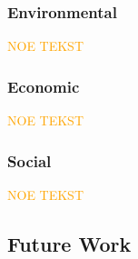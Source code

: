 \subsubsection{Environmental}

\textcolor{orange}{NOE TEKST}

\subsubsection{Economic}

\textcolor{orange}{NOE TEKST}

\subsubsection{Social}

\textcolor{orange}{NOE TEKST}

\subsection{Future Work}


